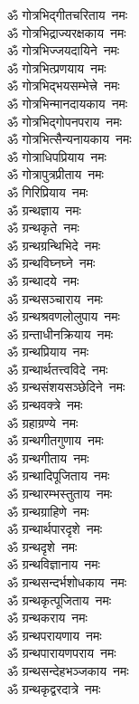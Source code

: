 \begin{multicols}{2}
\begin{flushleft}
ॐ गोत्रभिद्गीतचरिताय~नमः\\
ॐ गोत्रभिद्राज्यरक्षकाय~नमः\\
ॐ गोत्रभिज्जयदायिने~नमः\\
ॐ गोत्रभित्प्रणयाय~नमः\\
ॐ गोत्रभिद्भयसम्भेत्त्रे~नमः\\
ॐ गोत्रभिन्मानदायकाय~नमः\\
ॐ गोत्रभिद्गोपनपराय~नमः\hfill{}\\
ॐ गोत्रभित्सैन्यनायकाय~नमः\\
ॐ गोत्राधिपप्रियाय~नमः\\
ॐ गोत्रापुत्रप्रीताय~नमः\\
ॐ गिरिप्रियाय~नमः\\
ॐ ग्रन्थज्ञाय~नमः\\
ॐ ग्रन्थकृते~नमः\\
ॐ ग्रन्थग्रन्थिभिदे~नमः\\
ॐ ग्रन्थविघ्नघ्ने~नमः\\
ॐ ग्रन्थादये~नमः\\
ॐ ग्रन्थसञ्चाराय~नमः\hfill{}\\
ॐ ग्रन्थश्रवणलोलुपाय~नमः\\
ॐ ग्रन्ताधीनक्रियाय~नमः\\
ॐ ग्रन्थप्रियाय~नमः\\
ॐ ग्रन्थार्थतत्त्वविदे~नमः\\
ॐ ग्रन्थसंशयसञ्छेदिने~नमः\\
ॐ ग्रन्थवक्त्रे~नमः\\
ॐ ग्रहाग्रण्ये~नमः\\
ॐ ग्रन्थगीतगुणाय~नमः\\
ॐ ग्रन्थगीताय~नमः\\
ॐ ग्रन्थादिपूजिताय~नमः\hfill{}\\
ॐ ग्रन्थारम्भस्तुताय~नमः\\
ॐ ग्रन्थग्राहिणे~नमः\\
ॐ ग्रन्थार्थपारदृशे~नमः\\
ॐ ग्रन्थदृशे~नमः\\
ॐ ग्रन्थविज्ञानाय~नमः\\
ॐ ग्रन्थसन्दर्भशोधकाय~नमः\\
ॐ ग्रन्थकृत्पूजिताय~नमः\\
ॐ ग्रन्थकराय~नमः\\
ॐ ग्रन्थपरायणाय~नमः\\
ॐ ग्रन्थपारायणपराय~नमः\hfill{}\\
ॐ ग्रन्थसन्देहभञ्जकाय~नमः\\
ॐ ग्रन्थकृद्वरदात्रे~नमः\\

\end{flushleft}
\end{multicols}
